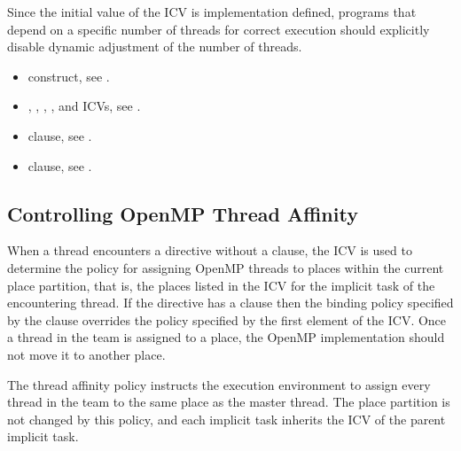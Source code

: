 \begin{note}
Since the initial value of the  ICV is implementation defined, programs
that depend on a specific number of threads for correct execution should explicitly
disable dynamic adjustment of the number of threads.
\end{note}

\crossreferences
\begin{itemize}

\item {} construct, see .

\item {}, , ,
, and  ICVs, see
.

\item {} clause, see .

\item {} clause, see .
\end{itemize}










\subsection{Controlling OpenMP Thread Affinity}
\label{subsec:Controlling OpenMP Thread Affinity}

When a thread encounters a  directive without a  clause, the  ICV is used to determine the policy for assigning OpenMP threads to places within the current place partition, that is, the places listed in the  ICV for the implicit task of the encountering thread. If the  directive has a  clause then the binding policy specified by the  clause overrides the policy specified by the first element of the  ICV. Once a thread in the team is assigned to a place, the OpenMP implementation should not move it to another place.

The  thread affinity policy instructs the execution environment to assign every thread in the team to the same place as the master thread. The place partition is not changed by this policy, and each implicit task inherits the  ICV of the parent implicit task.

